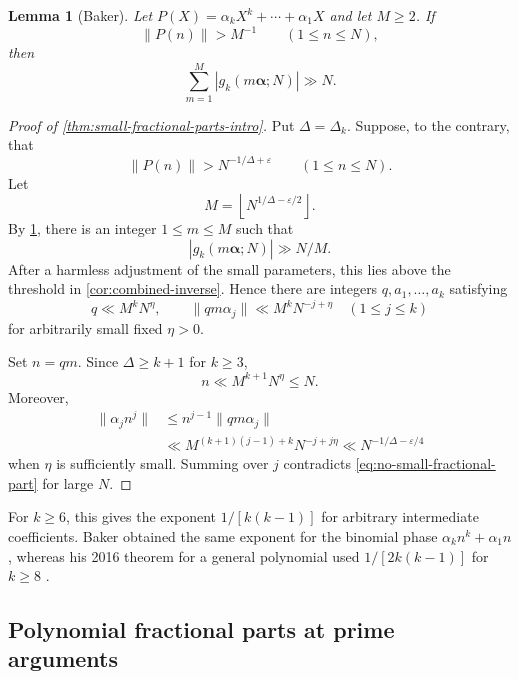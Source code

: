 \documentclass[11pt,reqno]{amsart}
\numberwithin{equation}{section}
\newtheorem{lemma}[lemma]{Lemma}
\theoremstyle{definition}
\theoremstyle{remark}
\begin{document}
\begin{lemma}[Baker]\label{lem:large-multiple}
Let $P(X)=\alpha_kX^k+\cdots+\alpha_1X$ and let $M\ge2$.  If
\[
  \|P(n)\|>M^{-1}
  \qquad(1\le n\le N),
\]
then
\begin{equation}\label{eq:large-multiple}
  \sum_{m=1}^{M}|g_k(m\boldsymbol\alpha;N)|\gg N.
\end{equation}
\end{lemma}

\begin{proof}[Proof of \cref{thm:small-fractional-parts-intro}]
Put $\Delta=\Delta_k$.  Suppose, to the contrary, that
\begin{equation}\label{eq:no-small-fractional-part}
  \|P(n)\|>N^{-1/\Delta+\varepsilon}
  \qquad(1\le n\le N).
\end{equation}
Let
\[
  M=\left\lfloor N^{1/\Delta-\varepsilon/2}\right\rfloor.
\]
By \cref{lem:large-multiple}, there is an integer $1\le m\le M$ such that
\begin{equation}\label{eq:large-multiple-one}
  |g_k(m\boldsymbol\alpha;N)|\gg N/M.
\end{equation}
After a harmless adjustment of the small parameters, this lies above the threshold in \cref{cor:combined-inverse}.  Hence there are integers $q,a_1,\ldots,a_k$ satisfying
\begin{equation}\label{eq:small-frac-q}
  q\ll M^kN^\eta,
  \qquad
  \|qm\alpha_j\|\ll M^kN^{-j+\eta}
  \quad(1\le j\le k)
\end{equation}
for arbitrarily small fixed $\eta>0$.

Set $n=qm$.  Since $\Delta\ge k+1$ for $k\ge3$,
\[
  n\ll M^{k+1}N^\eta\le N.
\]
Moreover,
\begin{align*}
  \|\alpha_jn^j\|
  &\le n^{j-1}\|qm\alpha_j\|\\
  &\ll M^{(k+1)(j-1)+k}N^{-j+j\eta}
  \ll N^{-1/\Delta-\varepsilon/4}
\end{align*}
when $\eta$ is sufficiently small.  Summing over $j$ contradicts \eqref{eq:no-small-fractional-part} for large $N$.
\end{proof}

For $k\ge6$, this gives the exponent $1/[k(k-1)]$ for arbitrary intermediate coefficients.  Baker obtained the same exponent for the binomial phase $\alpha_kn^k+\alpha_1n$, whereas his 2016 theorem for a general polynomial used $1/[2k(k-1)]$ for $k\ge8$ \cite[Theorems~1 and~2(a)]{Baker2016}.

\subsection{Polynomial fractional parts at prime arguments}
\end{document}
